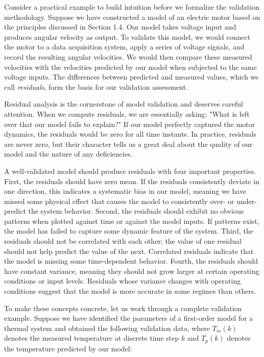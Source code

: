 Consider a practical example to build intuition before we formalize the validation methodology. Suppose we have constructed a model of an electric motor based on the principles discussed in Section 1.4. Our model takes voltage input and produces angular velocity as output. To validate this model, we would connect the motor to a data acquisition system, apply a series of voltage signals, and record the resulting angular velocities. We would then compare these measured velocities with the velocities predicted by our model when subjected to the same voltage inputs. The differences between predicted and measured values, which we call \emph{residuals}, form the basis for our validation assessment.

Residual analysis is the cornerstone of model validation and deserves careful attention. When we compute residuals, we are essentially asking: "What is left over that our model fails to explain?" If our model perfectly captured the motor dynamics, the residuals would be zero for all time instants. In practice, residuals are never zero, but their character tells us a great deal about the quality of our model and the nature of any deficiencies.

A well-validated model should produce residuals with four important properties. First, the residuals should have zero mean. If the residuals consistently deviate in one direction, this indicates a systematic bias in our model, meaning we have missed some physical effect that causes the model to consistently over- or under-predict the system behavior. Second, the residuals should exhibit no obvious patterns when plotted against time or against the model inputs. If patterns exist, the model has failed to capture some dynamic feature of the system. Third, the residuals should not be correlated with each other; the value of one residual should not help predict the value of the next. Correlated residuals indicate that the model is missing some time-dependent behavior. Fourth, the residuals should have constant variance, meaning they should not grow larger at certain operating conditions or input levels. Residuals whose variance changes with operating conditions suggest that the model is more accurate in some regimes than others.

To make these concepts concrete, let us work through a complete validation example. Suppose we have identified the parameters of a first-order model for a thermal system and obtained the following validation data, where $T_m(k)$ denotes the measured temperature at discrete time step $k$ and $T_p(k)$ denotes the temperature predicted by our model:

